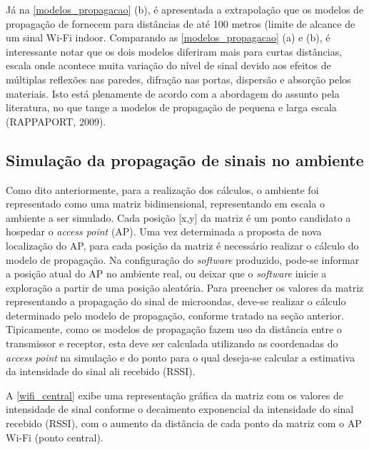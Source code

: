 \documentclass[
	12pt,				%
	openright,			%
	twoside,			%
	a4paper,			%
	english,			%
	french,				%
	spanish,			%
	brazil				%
	]{abntex2}
\begin{document}
Já na \autoref{modelos_propagacao} (b), é apresentada a extrapolação que os modelos de propagação de fornecem para distâncias de até 100 metros (limite de alcance de um sinal Wi-Fi indoor. Comparando as \autoref{modelos_propagacao} (a) e (b), é interessante notar que os dois modelos diferiram mais para curtas distâncias, escala onde acontece muita variação do nível de sinal devido aos efeitos de múltiplas reflexões nas paredes, difração nas portas, dispersão e absorção pelos materiais. Isto está plenamente de acordo com a abordagem do assunto pela literatura, no que tange a modelos de propagação de pequena e larga escala (RAPPAPORT, 2009). 

\clearpage

\subsection[Simulação da propagação de sinais no ambiente]{Simulação da propagação de sinais no ambiente}

Como dito anteriormente, para a realização dos cálculos, o ambiente foi representado como uma matriz bidimensional, representando em escala o ambiente a ser simulado. Cada posição [x,y] da matriz é um ponto candidato a hospedar o \textit{access point} (AP). Uma vez determinada a proposta de nova localização do AP, para cada posição da matriz é necessário realizar o cálculo do modelo de propagação. Na configuração do \textit{software} produzido, pode-se informar a posição atual do AP no ambiente real, ou deixar que o \textit{software} inicie a exploração a partir de uma posição aleatória. Para preencher os valores da matriz representando a propagação do sinal de microondas, deve-se realizar o cálculo determinado pelo modelo de propagação, conforme tratado na seção anterior. Tipicamente, como os modelos de propagação fazem uso da distância entre o transmissor e receptor, esta deve ser calculada utilizando as coordenadas do \textit{access point} na simulação e do ponto para o qual deseja-se calcular a estimativa da intensidade do sinal ali recebido (RSSI). 

A \autoref{wifi_central} exibe uma representação gráfica da matriz com os valores de intensidade de sinal conforme o decaimento exponencial da intensidade do sinal recebido (RSSI), com o aumento da distância de cada ponto da matriz com o AP Wi-Fi (ponto central).
\end{document}
